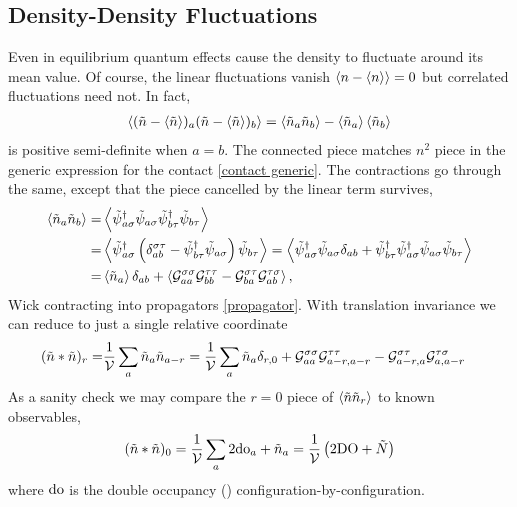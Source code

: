 \subsection{Density-Density Fluctuations}\label{sec:density fluctuations}

Even in equilibrium quantum effects cause the density to fluctuate around its mean value.
Of course, the linear fluctuations vanish $\left\langle n - \left\langle n \right\rangle \right\rangle = 0$ but correlated fluctuations need not.
In fact,
\begin{align}
    \left\langle  (\tilde{n}-\left\langle \tilde{n} \right\rangle)_a (\tilde{n}-\left\langle \tilde{n} \right\rangle)_b  \right\rangle
    =
    \left\langle  \tilde{n}_a \tilde{n}_b  \right\rangle - \left\langle \tilde{n}_a \right\rangle \left\langle \tilde{n}_b \right\rangle
\end{align}
is positive semi-definite when $a=b$.
The connected piece matches $n^2$ piece in the generic expression for the contact \eqref{contact generic}.
The contractions go through the same, except that the piece cancelled by the linear term survives,
\begin{align}
    \left\langle \tilde{n}_a \tilde{n}_b \right\rangle
    =&
    \left\langle 
        \tilde{\psi}{}^{\dagger}_{a\sigma} \tilde{\psi}_{a\sigma} \tilde{\psi}{}^{\dagger}_{b\tau} \tilde{\psi}_{b\tau}
         \right\rangle
    \nonumber\\
    =&
    \left\langle 
        \tilde{\psi}{}^{\dagger}_{a\sigma} \left(\delta_{ab}^{\sigma\tau} - \tilde{\psi}{}^{\dagger}_{b\tau} \tilde{\psi}_{a\sigma}\right) \tilde{\psi}_{b\tau}
         \right\rangle
    =
    \left\langle 
        \tilde{\psi}{}^{\dagger}_{a\sigma} \tilde{\psi}_{a\sigma} \delta_{ab}
    +   \tilde{\psi}{}^{\dagger}_{b\tau} \tilde{\psi}{}^{\dagger}_{a\sigma} \tilde{\psi}_{a\sigma} \tilde{\psi}_{b\tau}
     \right\rangle
    \nonumber\\
    =&
    \left\langle \tilde{n}_a \right\rangle \delta_{ab}
    +
    \left\langle 
        \mathcal{G}^{\sigma\sigma}_{aa} \mathcal{G}^{\tau\tau}_{bb}
    -   \mathcal{G}^{\sigma\tau}_{ba} \mathcal{G}^{\tau\sigma}_{ab}
     \right\rangle,
\end{align}
Wick contracting into propagators \eqref{propagator}.
With translation invariance we can reduce to just a single relative coordinate
\begin{align}
    (\tilde{n}*\tilde{n})_r 
    =&
    \frac{1}{\mathcal{V}} \sum_a \tilde{n}_a \tilde{n}_{a-r}
    =
    \frac{1}{\mathcal{V}} \sum_a \tilde{n}_a \delta_{r,0}
    +   \mathcal{G}^{\sigma\sigma}_{aa} \mathcal{G}^{\tau\tau}_{a-r,a-r}
    -   \mathcal{G}^{\sigma\tau}_{a-r,a} \mathcal{G}^{\tau\sigma}_{a,a-r}
    \label{eq:nn}
\end{align}
As a sanity check we may compare the $r=0$ piece of $\left\langle \tilde{n}\tilde{n}_r \right\rangle$ to known observables,
\begin{align}
    (\tilde{n}*\tilde{n})_0 = \frac{1}{\mathcal{V}}\sum_a 2 \textrm{do}_a + \tilde{n}_a = \frac{1}{\mathcal{V}}\left( 2 \textrm{DO} + \tilde{N} \right)
\end{align}
where $\textrm{do}$ is the double occupancy () configuration-by-configuration.

